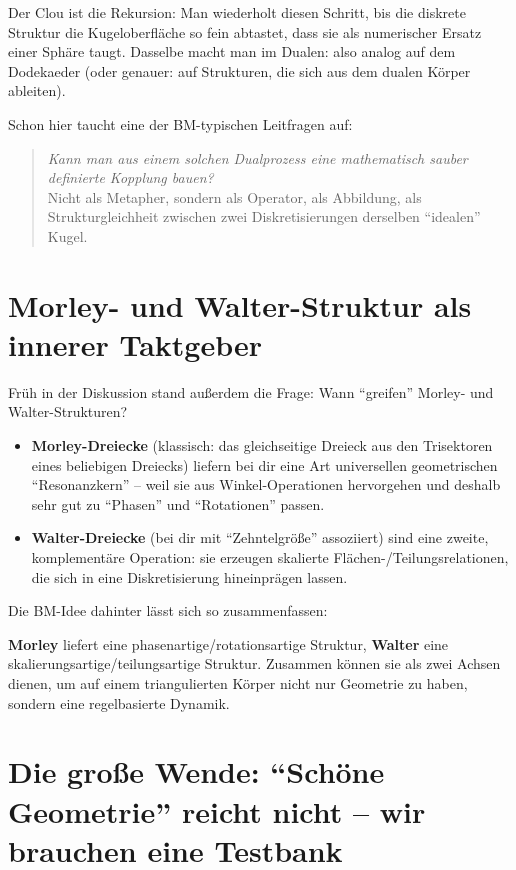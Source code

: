 \documentclass[11pt,a4paper]{article}
\begin{document}
Der Clou ist die Rekursion: Man wiederholt diesen Schritt, bis die diskrete Struktur die Kugeloberfläche so fein abtastet, dass sie als numerischer Ersatz einer Sphäre taugt. Dasselbe macht man im Dualen: also analog auf dem Dodekaeder (oder genauer: auf Strukturen, die sich aus dem dualen Körper ableiten).

Schon hier taucht eine der BM-typischen Leitfragen auf:

\begin{quote}
\emph{Kann man aus einem solchen Dualprozess eine mathematisch sauber definierte Kopplung bauen?}\\
Nicht als Metapher, sondern als Operator, als Abbildung, als Strukturgleichheit zwischen zwei Diskretisierungen derselben ``idealen'' Kugel.
\end{quote}

\section{Morley- und Walter-Struktur als innerer Taktgeber}

Früh in der Diskussion stand außerdem die Frage: Wann ``greifen'' Morley- und Walter-Strukturen?
\begin{itemize}[leftmargin=*,itemsep=0.5em]
    \item \textbf{Morley-Dreiecke} (klassisch: das gleichseitige Dreieck aus den Trisektoren eines beliebigen Dreiecks) liefern bei dir eine Art universellen geometrischen ``Resonanzkern'' -- weil sie aus Winkel-Operationen hervorgehen und deshalb sehr gut zu ``Phasen'' und ``Rotationen'' passen.
    \item \textbf{Walter-Dreiecke} (bei dir mit ``Zehntelgröße'' assoziiert) sind eine zweite, komplementäre Operation: sie erzeugen skalierte Flächen-/Teilungsrelationen, die sich in eine Diskretisierung hineinprägen lassen.
\end{itemize}

Die BM-Idee dahinter lässt sich so zusammenfassen:

\textbf{Morley} liefert eine phasenartige/rotationsartige Struktur, \textbf{Walter} eine skalierungsartige/teilungsartige Struktur. Zusammen können sie als zwei Achsen dienen, um auf einem triangulierten Körper nicht nur Geometrie zu haben, sondern eine regelbasierte Dynamik.

\section{Die große Wende: ``Schöne Geometrie'' reicht nicht -- wir brauchen eine Testbank}
\end{document}
